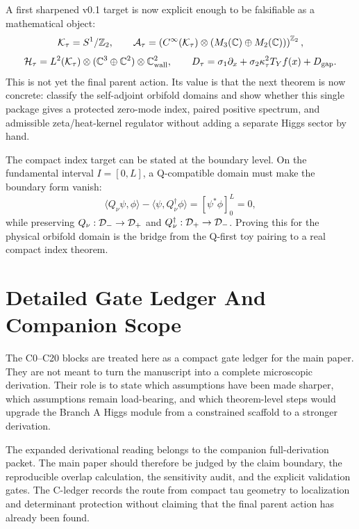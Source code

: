 \documentclass[11pt]{article}
\begin{document}
A first sharpened v0.1 target is now explicit enough to be falsifiable as a
mathematical object:
\begin{equation}
{\cal K}_\tau=S^1/\mathbb Z_2,\qquad
{\cal A}_\tau=
\left(C^\infty({\cal K}_\tau)\otimes(M_3(\mathbb C)\oplus M_2(\mathbb C))\right)^{\mathbb Z_2},
\end{equation}
\begin{equation}
{\cal H}_\tau=
L^2({\cal K}_\tau)\otimes(\mathbb C^3\oplus\mathbb C^2)\otimes\mathbb C^2_{\rm wall},
\qquad
D_\tau=\sigma_1\partial_x+\sigma_2\kappa_\tau^2T_Y f(x)+D_{\rm gap} .
\end{equation}
This is not yet the final parent action.  Its value is that the next theorem is
now concrete: classify the self-adjoint orbifold domains and show whether this
single package gives a protected zero-mode index, paired positive spectrum,
and admissible zeta/heat-kernel regulator without adding a separate Higgs
sector by hand.

The compact index target can be stated at the boundary level.  On the
fundamental interval $I=[0,L]$, a Q-compatible domain must make the boundary
form vanish:
\begin{equation}
\langle Q_\nu\psi,\phi\rangle-\langle\psi,Q_\nu^\dagger\phi\rangle
=\left[\psi^*\phi\right]_0^L=0,
\end{equation}
while preserving $Q_\nu:{\cal D}_-\to{\cal D}_+$ and
$Q_\nu^\dagger:{\cal D}_+\to{\cal D}_-$.  Proving this for the physical
orbifold domain is the bridge from the Q-first toy pairing to a real compact
index theorem.


\section{Detailed Gate Ledger And Companion Scope}
The C0--C20 blocks are treated here as a compact gate ledger for the main
paper.  They are not meant to turn the manuscript into a complete microscopic
derivation.  Their role is to state which assumptions have been made sharper,
which assumptions remain load-bearing, and which theorem-level steps would
upgrade the Branch A Higgs module from a constrained scaffold to a stronger
derivation.

The expanded derivational reading belongs to the companion full-derivation
packet.  The main paper should therefore be judged by the claim boundary,
the reproducible overlap calculation, the sensitivity audit, and the explicit
validation gates.  The C-ledger records the route from compact tau geometry to
localization and determinant protection without claiming that the final parent
action has already been found.
\end{document}
